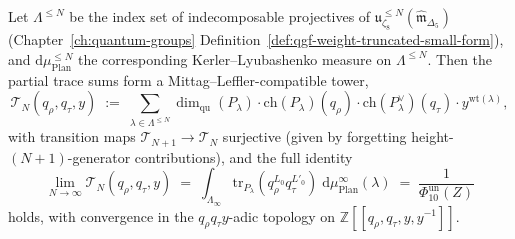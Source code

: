 \begin{theorem}
\label{thm:modtr-plancherel-ml-limit}
Let $\Lambda^{\leq N}$ be the index set of indecomposable projectives
of $\mathfrak u_{\zeta_8}^{\leq N}(\widehat{\mathfrak m}_{\Delta_5})$
(Chapter~\ref{ch:quantum-groups}
Definition~\ref{def:qgf-weight-truncated-small-form}), and
$\mathrm d\mu_{\mathrm{Plan}}^{\leq N}$ the corresponding
Kerler--Lyubashenko measure on $\Lambda^{\leq N}$. Then the partial
trace sums form a Mittag--Leffler-compatible tower,
\[
 \mathcal T_N(q_\rho, q_\tau, y)
 \;:=\;
 \sum_{\lambda\in\Lambda^{\leq N}}
 \dim_{\mathrm{qu}}(P_\lambda)\cdot
 \mathrm{ch}(P_\lambda)(q_\rho)\cdot
 \mathrm{ch}(P_\lambda^\vee)(q_\tau)\cdot y^{\mathrm{wt}(\lambda)},
\]
with transition maps
$\mathcal T_{N+1}\to\mathcal T_N$ surjective (given by forgetting
height-$(N{+}1)$-generator contributions), and the full identity
\[
 \boxed{\;
 \lim_{N\to\infty}\mathcal T_N(q_\rho, q_\tau, y)
 \;=\;
 \int_{\Lambda_\infty}
 \mathrm{tr}_{P_\lambda}(q_\rho^{L_0}q_\tau^{L'_0})
 \;\mathrm d\mu_{\mathrm{Plan}}^{\infty}(\lambda)
 \;=\;
 \frac{1}{\Phi_{10}^{\mathrm{un}}(Z)}\;}
\]
holds, with convergence in the $q_\rho q_\tau y$-adic topology
on $\mathbb Z[[q_\rho, q_\tau, y, y^{-1}]]$.
\end{theorem}

